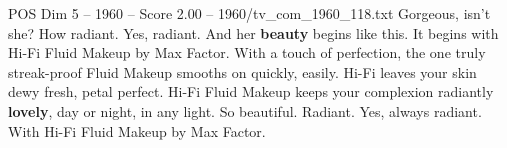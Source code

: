 \begin{textsample}{POS Dim 5 – 1960 – Score 2.00 – 1960/tv\_com\_1960\_118.txt}  \label{ex:f5_pos_088}
Gorgeous, isn't she?
How radiant.
Yes, radiant.
And her \textbf{beauty} begins like this.
It begins with Hi-Fi Fluid Makeup by Max Factor.
With a touch of perfection, the one truly streak-proof Fluid Makeup smooths on quickly, easily.
Hi-Fi leaves your skin dewy fresh, petal perfect.
Hi-Fi Fluid Makeup keeps your complexion radiantly \textbf{lovely}, day or night, in any light.
So beautiful.
Radiant.
Yes, always radiant.
With Hi-Fi Fluid Makeup by Max Factor.

\end{textsample}
